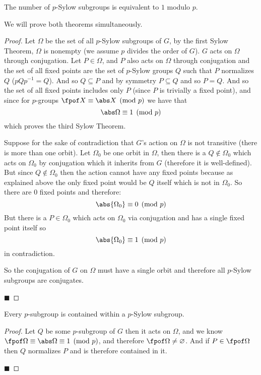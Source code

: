 \documentclass[10pt]{article}
\begin{document}
\begin{thrm*}

    The number of $p$-Sylow subgroups is equivalent to $1$ modulo $p$.

\end{thrm*}

We will prove both theorems simultaneously.

\begin{proof}

    Let $\Omega$ be the set of all $p$-Sylow subgroups of $G$, by the first Sylow Theorem, $\Omega$ is nonempty (we assume $p$ divides the order of $G$).
    $G$ acts on $\Omega$ through conjugation.
    Let $P\in\Omega$, and $P$ also acts on $\Omega$ through conjugation and the set of all fixed points are the set of $p$-Sylow groups $Q$ such that $P$ normalizes $Q$ ($pQp^{-1}=Q$).
    And so $Q\subseteq P$ and by symmetry $P\subseteq Q$ and so $P=Q$.
    And so the set of all fixed points includes only $P$ (since $P$ is trivially a fixed point), and since for $p$-groups $\fpof X\equiv\abs X\pmod p$ we have that
    \[ \abs\Omega\equiv 1\pmod p \]
    which proves the third Sylow Theorem.

    Suppose for the sake of contradiction that $G$'s action on $\Omega$ is not transitive (there is more than one orbit).
    Let $\Omega_0$ be one orbit in $\Omega$, then there is a $Q\notin\Omega_0$ which acts on $\Omega_0$ by conjugation which it inherits from $G$ (therefore it is well-defined).
    But since $Q\notin\Omega_0$ then the action cannot have any fixed points because as explained above the only fixed point would be $Q$ itself which is not in $\Omega_0$.
    So there are $0$ fixed points and therefore:
    \[ \abs{\Omega_0}\equiv 0\pmod p \]
    But there is a $P\in\Omega_0$ which acts on $\Omega_0$ via conjugation and has a single fixed point itself so
    \[ \abs{\Omega_0}\equiv 1\pmod p \]
    in contradiction.

    So the conjugation of $G$ on $\Omega$ must have a single orbit and therefore all $p$-Sylow subgroups are conjugates.

    \hfill$\blacksquare$

\end{proof}

\begin{thrm*}

    Every $p$-subgroup is contained within a $p$-Sylow subgroup.

\end{thrm*}

\begin{proof}

    Let $Q$ be some $p$-subgroup of $G$ then it acts on $\Omega$, and we know $\fpof\Omega\equiv\abs\Omega\equiv1\pmod p$, and therefore $\fpof\Omega\neq\varnothing$.
    And if $P\in\fpof\Omega$ then $Q$ normalizes $P$ and is therefore contained in it.

    \hfill$\blacksquare$

\end{proof}
\end{document}
